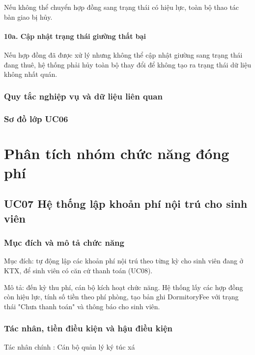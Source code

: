 Nếu không thể chuyển hợp đồng sang trạng thái có hiệu lực, toàn bộ thao tác bàn giao bị hủy.

\paragraph{10a. Cập nhật trạng thái giường thất bại}

Nếu hợp đồng đã được xử lý nhưng không thể cập nhật giường sang trạng thái đang thuê, hệ thống phải hủy toàn bộ thay đổi để không tạo ra trạng thái dữ liệu không nhất quán.

\subsubsection{Quy tắc nghiệp vụ và dữ liệu liên quan}


\subsubsection{Sơ đồ lớp UC06}


\section{Phân tích nhóm chức năng đóng phí}

\subsection{UC07 Hệ thống lập khoản phí nội trú cho sinh viên}

\subsubsection{Mục đích và mô tả chức năng}

Mục đích: tự động lập các khoản phí nội trú theo từng kỳ cho sinh viên đang ở KTX, để sinh viên có căn cứ thanh toán (UC08).

Mô tả: đến kỳ thu phí, cán bộ kích hoạt chức năng. Hệ thống lấy các hợp đồng còn hiệu lực, tính số tiền theo phí phòng, tạo bản ghi DormitoryFee với trạng thái "Chưa thanh toán" và thông báo cho sinh viên.

\subsubsection{Tác nhân, tiền điều kiện và hậu điều kiện}

Tác nhân chính : Cán bộ quản lý ký túc xá

